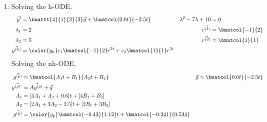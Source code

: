 \begin{enumerate}
    \item Solving the h-ODE,
          \begin{align}
              \vec{y'}                    & = \bmattt{4}{1}{2}{3} \vec{y}
              + \bmatcol{0.6t}{-2.5t}     &
              \lambda^{2} - 7\lambda + 10 & = 0                             \\
              \lambda_1                   & = 2                           &
              \vec{v^{(1)}}               & = \bmatcol{-1}{2}               \\
              \lambda_2                   & = 5                           &
              \vec{v^{(2)}}               & = \bmatcol{1}{1}                \\
              \vec{y^{(h)}}               & = \color{y_h}
              c_1 \bmatcol{-1}{2}e^{2t} + c_2 \bmatcol{1}{1} e^{5t}
          \end{align}
          Solving the nh-ODE,
          \begin{align}
              \vec{y^{(p)}}  & = \bmatcol{A_1 t + B_1}{A_2 t + B_2}  &
              \vec{g}        & = \bmatcol{0.6t}{-2.5t}                 \\
              \vec{y^{(p)'}} & = \vec{Ay^{(p)}} + \vec{g}              \\
              A_1            & = [4A_1 + A_2 + 0.6]t + [4B_1 + B_2]    \\
              A_2            & = [2A_1 + 3A_2 - 2.5]t +[2B_1 + 3B_2]   \\
              \vec{y^{(p)}}  & = \color{y_p} \bmatcol{-0.43}{1.12}t
              + \bmatcol{-0.241}{0.534}
          \end{align}


\end{enumerate}
